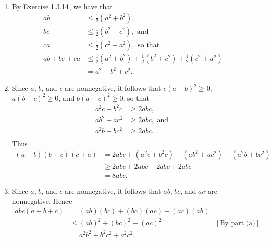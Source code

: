 \begin{enumerate}
      \begin{enumerate}
         \item By Exercise 1.3.14, we have that
               \begin{align*}
                  ab &\le \frac{1}{2}(a^2 + b^2), \\
                  bc &\le \frac{1}{2}(b^2 + c^2), \text{ and } \\
                  ca &\le \frac{1}{2}(c^2 + a^2), \text{ so that} \\
                  ab + bc + ca &\le \frac{1}{2}(a^2 + b^2) +
                                    \frac{1}{2}(b^2 + c^2) +
                                    \frac{1}{2}(c^2 + a^2) \\
                               &= a^2 + b^2 + c^2.
               \end{align*}
         \item Since $a$, $b$, and $c$ are nonnegative, it follows that
               $c(a - b)^2 \ge 0$, $a(b - c)^2 \ge 0$, and $b(a - c)^2 \ge 0$,
               so that
               \begin{align*}
                  a^2c + b^2c &\ge 2abc, \\
                  ab^2 + ac^2 &\ge 2abc, \text{ and } \\
                  a^2b + bc^2 &\ge 2abc. \\
               \end{align*}
               Thus
               \begin{align*}
                  (a + b)(b + c)(c + a) &= 2abc + (a^2c + b^2c) +
                                          (ab^2 + ac^2) + (a^2b + bc^2) \\
                                        &\ge 2abc + 2abc + 2abc + 2abc \\
                                        &= 8abc.
               \end{align*}
         \item Since $a$, $b$, and $c$ are nonnegative, it follows that $ab$,
               $bc$, and $ac$ are nonnegative. Hence
               \begin{align*}
                  abc(a + b + c) &= (ab)(bc) + (bc)(ac) + (ac)(ab) \\
                     &\le (ab)^2 + (bc)^2 + (ac)^2 &[\text{By part (a)}] \\
                     &= a^2b^2 + b^2c^2 + a^2c^2.
               \end{align*}
                 

\end{enumerate}
\end{enumerate}
